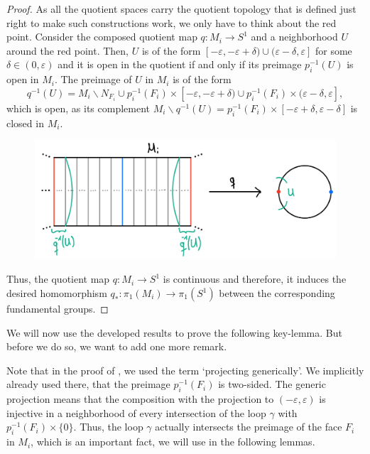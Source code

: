 \begin{proof}
    \noindent
    As all the quotient spaces carry the quotient topology that is defined just right to make such constructions work, we only have to think about the red point.
    Consider the composed quotient map \(q : M_i \to S^1\) and a neighborhood \(U\) around the red point.
    Then, \(U\) is of the form \([-\varepsilon, -\varepsilon + \delta) \cup (\varepsilon - \delta, \varepsilon]\) for some \(\delta \in (0, \varepsilon)\) and it is open in the quotient if and only if its preimage \(p_i^{-1}(U)\) is open in \(M_i\).
    The preimage of \(U\) in \(M_i\) is of the form
    \[q^{-1}(U) = M_i \backslash N_{F_i} \cup p_i^{-1}(F_i) \times [-\varepsilon, -\varepsilon + \delta) \cup p_i^{-1}(F_i) \times (\varepsilon - \delta, \varepsilon],\]
    which is open, as its complement \(M_i \backslash q^{-1}(U) = p_i^{-1}(F_i) \times [-\varepsilon + \delta, \varepsilon - \delta]\) is closed in \(M_i\).
    \begin{figure}[h!]
        \label{img:quotientnbhd}
        \centering
        \includegraphics[width=.5\textwidth]{gfx/Quotient neighborhood .png}
    \end{figure}\vspace*{-2\parskip}

    \noindent
    Thus, the quotient map \(q : M_i \to S^1\) is continuous and therefore, it induces the desired homomorphism \(q_* : \pi_1(M_i) \to \pi_1(S^1)\) between the corresponding fundamental groups.
\end{proof}

We will now use the developed results to prove the following key-lemma.
But before we do so, we want to add one more remark.

\begin{remark} %
    Note that in the proof of , we used the term `projecting generically'.
    We implicitly already used there, that the preimage \(p_i^{-1}(F_i)\) is two-sided.
    The generic projection means that the composition with the projection to \((-\varepsilon, \varepsilon)\) is injective in a neighborhood of every intersection of the loop \(\gamma\) with \(p_i^{-1}(F_i) \times \{0\}\).
    Thus, the loop \(\gamma\) actually intersects the preimage of the face \(F_i\) in \(M_i\), which is an important fact, we will use in the following lemmas.
\end{remark}

